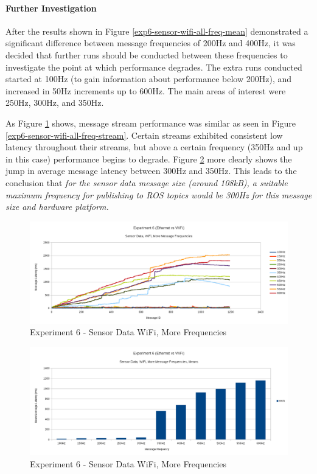 \documentclass[../dissertation.tex]{subfiles}
\begin{document}
\paragraph{Further Investigation} After the results shown in Figure \ref{exp6-sensor-wifi-all-freq-mean} demonstrated a significant difference between message frequencies of 200Hz and 400Hz, it was decided that further runs should be conducted between these frequencies to investigate the point at which performance degrades. The extra runs conducted started at 100Hz (to gain information about performance below 200Hz), and increased in 50Hz increments up to 600Hz. The main areas of interest were 250Hz, 300Hz, and 350Hz.

As Figure \ref{exp6-sensor-wifi-more-freq-stream} shows, message stream performance was similar as seen in Figure \ref{exp6-sensor-wifi-all-freq-stream}. Certain streams exhibited consistent low latency throughout their streams, but above a certain frequency (350Hz and up in this case) performance begins to degrade. Figure \ref{exp6-sensor-wifi-more-freq-means} more clearly shows the jump in average message latency between 300Hz and 350Hz. This leads to the conclusion that \textit{for the sensor data message size (around 108kB), a suitable maximum frequency for publishing to ROS topics would be 300Hz for this message size and hardware platform.}

\begin{figure}[H]
\centering
\includegraphics[width=\textwidth]{images/experiment6/sensor_data_wifi_more_freqs_stream.png}
\caption{Experiment 6 - Sensor Data WiFi, More Frequencies}
\label{exp6-sensor-wifi-more-freq-stream}
\end{figure}

\begin{figure}[H]
\centering
\includegraphics[width=\textwidth]{images/experiment6/sensor_data_wifi_more_freqs_means.png}
\caption{Experiment 6 - Sensor Data WiFi, More Frequencies}
\label{exp6-sensor-wifi-more-freq-means}
\end{figure}
\end{document}

